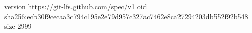 version https://git-lfs.github.com/spec/v1
oid sha256:ecb30f9cecaa3c794c195e2e79d957c327ac7462e8ca27294203db552f92b548
size 2999
